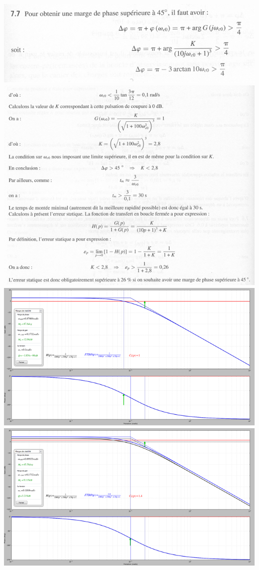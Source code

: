 \documentclass[10pt,fleqn]{article} %
\begin{document}
\newpage


\begin{center}
	\includegraphics[width=.8\linewidth]{images/cor_01}
		\includegraphics[width=.8\linewidth]{images/cor_02}
			\includegraphics[width=.8\linewidth]{images/cor_03}
				\includegraphics[width=.8\linewidth]{images/cor_04}
\end{center}
\end{document}
